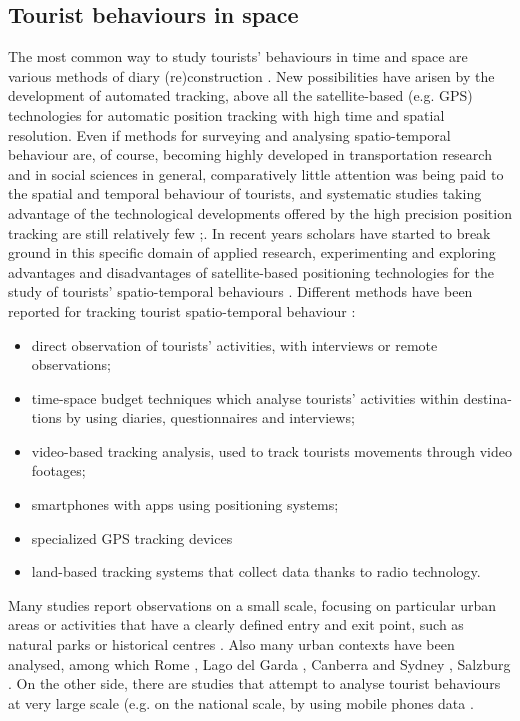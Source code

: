 \documentclass[a4paper]{article}
\begin{document}
\subsection{Tourist behaviours in space}
The most common way to study tourists’ behaviours in time and space are various methods of diary (re)construction \cite{Shoval2014}. New possibilities have arisen by the development of automated tracking, above all the satellite-based (e.g. GPS) technologies for automatic position tracking with high time and spatial resolution.
Even if methods for surveying and analysing spatio-temporal behaviour are, of course, becoming highly developed in transportation research and in social sciences in general, comparatively little attention was being paid to the spatial and temporal behaviour of tourists, and systematic studies taking advantage of the technological developments offered by the high precision position tracking are still relatively few \cite{Shoval2007};\cite{Shoval2014}.
In recent years scholars have started to break ground in this specific domain of applied research, experimenting and exploring advantages and disadvantages of satellite-based positioning technologies for the study of tourists’ spatio-temporal behaviours \cite{Shoval2010}.
Different methods have been reported for tracking tourist spatio-temporal behaviour \cite{Kellner2016}:
\begin{itemize}
    \item direct observation of tourists’ activities, with interviews or remote observations;
    \item {time-space budget techniques \cite{Pearce1988} which analyse tourists’ activities within destina-tions by using diaries, questionnaires and interviews;}
    \item {video-based tracking analysis, used to track tourists movements through video footages;}
    \item {smartphones with apps using positioning systems;}
    \item {specialized GPS tracking devices}
    \item {land-based tracking systems that collect data thanks to radio technology.}
\end{itemize}
Many studies report observations on a small scale, focusing on particular urban areas or activities that have a clearly defined entry and exit point, such as natural parks or historical centres \cite{Shoval2014}. Also many urban contexts have been analysed, among which Rome \cite{Calabrese2006}, Lago del Garda \cite{Bruno2010}, Canberra and Sydney \cite{Edwards2009}, Salzburg \cite{Kellner2016}. On the other side, there are studies that attempt to analyse tourist behaviours at very large scale (e.g. on the national scale, by using mobile phones data \cite{Ahas2007}.
\end{document}
